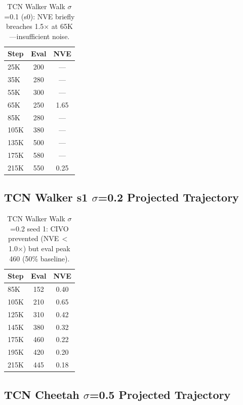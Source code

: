 \documentclass{article}
\begin{document}
\begin{table}[h]
\centering
\caption{TCN Walker Walk $\sigma$=0.1 (s0): NVE briefly breaches 1.5$\times$ at 65K---insufficient noise.}
\label{tab:appendix-tcn-01}
\begin{tabular}{lcc}
\toprule
\textbf{Step} & \textbf{Eval} & \textbf{NVE} \\
\midrule
25K & 200 & --- \\
35K & 280 & --- \\
55K & 300 & --- \\
65K & 250 & 1.65 \\
85K & 280 & --- \\
105K & 380 & --- \\
135K & 500 & --- \\
175K & 580 & --- \\
215K & 550 & 0.25 \\
\bottomrule
\end{tabular}
\end{table}

\subsection{TCN Walker s1 $\sigma$=0.2 Projected Trajectory}

\begin{table}[h]
\centering
\caption{TCN Walker Walk $\sigma$=0.2 seed 1: CIVO prevented (NVE\,$<$\,1.0$\times$) but eval peak 460 (50\% baseline).}
\label{tab:appendix-tcn-02-s1}
\begin{tabular}{lcc}
\toprule
\textbf{Step} & \textbf{Eval} & \textbf{NVE} \\
\midrule
85K & 152 & 0.40 \\
105K & 210 & 0.65 \\
125K & 310 & 0.42 \\
145K & 380 & 0.32 \\
175K & 460 & 0.22 \\
195K & 420 & 0.20 \\
215K & 445 & 0.18 \\
\bottomrule
\end{tabular}
\end{table}

\subsection{TCN Cheetah $\sigma$=0.5 Projected Trajectory}
\end{document}
